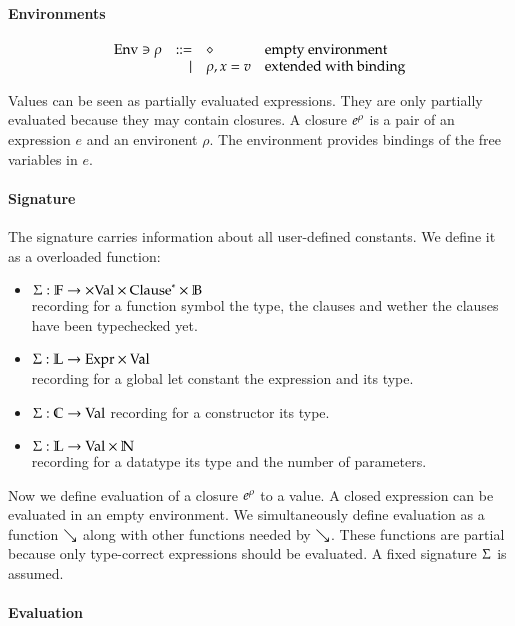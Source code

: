 \paragraph{Environments}
\[
\begin{array}{lrll}
\mathrm{Env} \ni \rho & ::= & \diamond & \mbox{empty environment}\\
& \mid & \rho,x = v & \mbox{extended with binding}\\
\end{array}
\]

Values can be seen as partially evaluated expressions.
They are only partially evaluated because they may contain closures.
A closure $e^{\rho}$ is a pair of an expression $e$ and an environent $\rho$.
The environment provides bindings of the free variables in $e$.
\paragraph*{Signature}
The signature carries information about all user-defined constants.
We define it as a overloaded function:
\begin{itemize}
\item
$ \mathrm{\Sigma} : \mathbb{F} \rightarrow \times \mathrm{Val} \times {\mathrm{Clause}}^{\ast} \times \mathbb{B} $\\
recording for a function symbol the type, the clauses and wether the clauses have been typechecked yet.
\item
$ \mathrm{\Sigma} : \mathbb{L} \rightarrow \mathrm{Expr} \times \mathrm{Val} $ \\
recording for a global let constant the expression and its type. 
\item
$ \mathrm{\Sigma} : \mathbb{C} \rightarrow \mathrm{Val} $
recording for a constructor its type.
\item
$ \mathrm{\Sigma} : \mathbb{L} \rightarrow \mathrm{Val} \times \mathbb{N} $\\
recording for a datatype its type and the number of parameters.
\end{itemize}

Now we define evaluation of a closure $e^{\rho}$ to a value. 
A closed expression can be evaluated in an empty environment.
We simultaneously define evaluation as a function $\searrow$ along with other functions needed by $\searrow$.     
These functions are partial because only type-correct expressions should be evaluated.
A fixed signature $\mathrm{\Sigma}$ is assumed.

\paragraph*{Evaluation}

